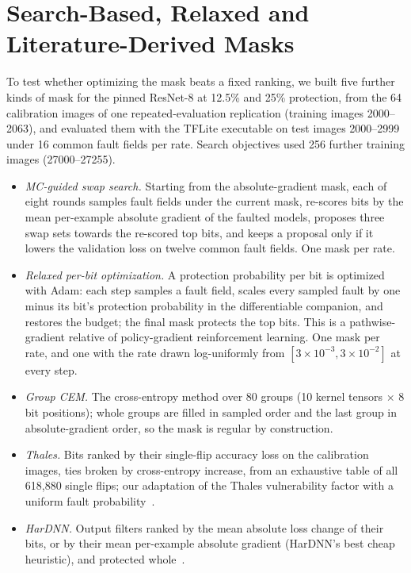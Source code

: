 \section{Search-Based, Relaxed and Literature-Derived Masks}\label{app:search}
To test whether optimizing the mask beats a fixed ranking, we built five further kinds of mask for the pinned ResNet-8 at 12.5\% and 25\% protection, from the 64 calibration images of one repeated-evaluation replication (training images 2000--2063), and evaluated them with the TFLite executable on test images 2000--2999 under 16 common fault fields per rate. Search objectives used 256 further training images (27000--27255).
\begin{itemize}
\item \emph{MC-guided swap search.} Starting from the absolute-gradient mask, each of eight rounds samples fault fields under the current mask, re-scores bits by the mean per-example absolute gradient of the faulted models, proposes three swap sets towards the re-scored top bits, and keeps a proposal only if it lowers the validation loss on twelve common fault fields. One mask per rate.
\item \emph{Relaxed per-bit optimization.} A protection probability per bit is optimized with Adam: each step samples a fault field, scales every sampled fault by one minus its bit's protection probability in the differentiable companion, and restores the budget; the final mask protects the top bits. This is a pathwise-gradient relative of policy-gradient reinforcement learning. One mask per rate, and one with the rate drawn log-uniformly from $[3\times10^{-3},3\times10^{-2}]$ at every step.
\item \emph{Group CEM.} The cross-entropy method over 80 groups (10 kernel tensors $\times$ 8 bit positions); whole groups are filled in sampled order and the last group in absolute-gradient order, so the mask is regular by construction.
\item \emph{Thales.} Bits ranked by their single-flip accuracy loss on the calibration images, ties broken by cross-entropy increase, from an exhaustive table of all 618,880 single flips; our adaptation of the Thales vulnerability factor with a uniform fault probability~\cite{tyagi2023thales}.
\item \emph{HarDNN.} Output filters ranked by the mean absolute loss change of their bits, or by their mean per-example absolute gradient (HarDNN's best cheap heuristic), and protected whole~\cite{mahmoud2020hardnn}.
\end{itemize}
